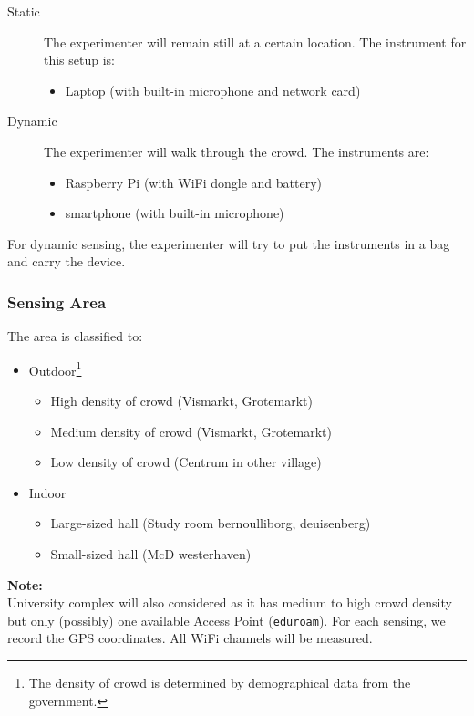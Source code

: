 \documentclass{article}
\begin{document}
\label{ssub:sensing_setup}
\begin{description}
	\item[Static] The experimenter will remain still at a certain location. The instrument for this setup is:
	\begin{itemize}
		\item Laptop (with built-in microphone and network card)
	\end{itemize}

	\item[Dynamic] The experimenter will walk through the crowd. The instruments are:
	\begin{itemize}
		\item Raspberry Pi (with WiFi dongle and battery)
		\item smartphone (with built-in microphone)
	\end{itemize}
\end{description}

For dynamic sensing, the experimenter will try to put the instruments in a bag and carry the device.

\subsubsection*{Sensing Area} %
\label{ssub:sensing_area}
The area is classified to:
\begin{itemize}
	\item Outdoor\footnote{The density of crowd is determined by demographical data from the government.}
	\begin{itemize}
		\item High density of crowd (Vismarkt, Grotemarkt)
		\item Medium density of crowd (Vismarkt, Grotemarkt)
		\item Low density of crowd (Centrum in other village)
	\end{itemize}
	
	\item Indoor
	\begin{itemize}
		\item Large-sized hall (Study room bernoulliborg, deuisenberg)
		\item Small-sized hall (McD westerhaven)
	\end{itemize}
\end{itemize}

\textbf{Note:}\\
University complex will also considered as it has medium to high crowd density but only (possibly) one available Access Point (\texttt{eduroam}). For each sensing, we record the GPS coordinates. All WiFi channels will be measured.
\end{document}
